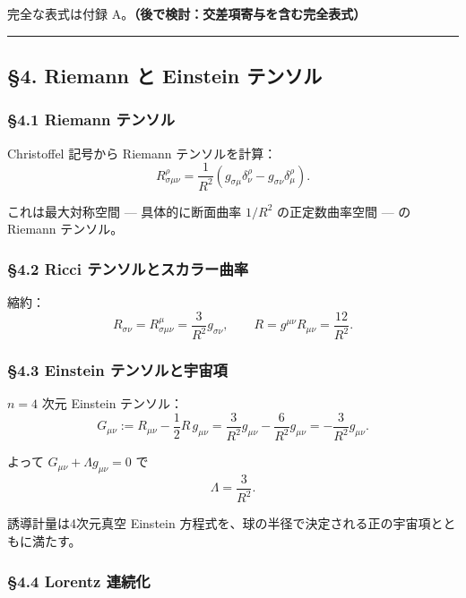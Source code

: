 \documentclass[a4paper,11pt]{ltjsarticle}
\theoremstyle{definition}
\begin{document}
完全な表式は付録 A。\textbf{（後で検討：交差項寄与を含む完全表式）}

\begin{center}\rule{0.5\linewidth}{0.5pt}\end{center}

\subsection{§4. Riemann と Einstein
テンソル}\label{riemann-ux3068-einstein-ux30c6ux30f3ux30bdux30eb}

\subsubsection{§4.1 Riemann
テンソル}\label{riemann-ux30c6ux30f3ux30bdux30eb}

Christoffel 記号から Riemann テンソルを計算：
\[R^\rho_{\sigma\mu\nu} = \frac{1}{R^2}(g_{\sigma\mu} \delta^\rho_\nu - g_{\sigma\nu} \delta^\rho_\mu).\]

これは最大対称空間 --- 具体的に断面曲率 \(1/R^2\) の正定数曲率空間 ---
の Riemann テンソル。

\subsubsection{§4.2 Ricci
テンソルとスカラー曲率}\label{ricci-ux30c6ux30f3ux30bdux30ebux3068ux30b9ux30abux30e9ux30fcux66f2ux7387}

縮約：
\[R_{\sigma\nu} = R^\mu_{\sigma\mu\nu} = \frac{3}{R^2} g_{\sigma\nu}, \qquad R = g^{\mu\nu} R_{\mu\nu} = \frac{12}{R^2}.\]

\subsubsection{§4.3 Einstein
テンソルと宇宙項}\label{einstein-ux30c6ux30f3ux30bdux30ebux3068ux5b87ux5b99ux9805}

\(n = 4\) 次元 Einstein テンソル：
\[G_{\mu\nu} := R_{\mu\nu} - \frac{1}{2} R\, g_{\mu\nu} = \frac{3}{R^2} g_{\mu\nu} - \frac{6}{R^2} g_{\mu\nu} = -\frac{3}{R^2} g_{\mu\nu}.\]

よって \(G_{\mu\nu} + \Lambda g_{\mu\nu} = 0\) で
\[\boxed{\;\Lambda = \frac{3}{R^2}.\;}\]

誘導計量は4次元真空 Einstein
方程式を、球の半径で決定される正の宇宙項とともに満たす。

\subsubsection{§4.4 Lorentz 連続化}\label{lorentz-ux9023ux7d9aux5316}
\end{document}

